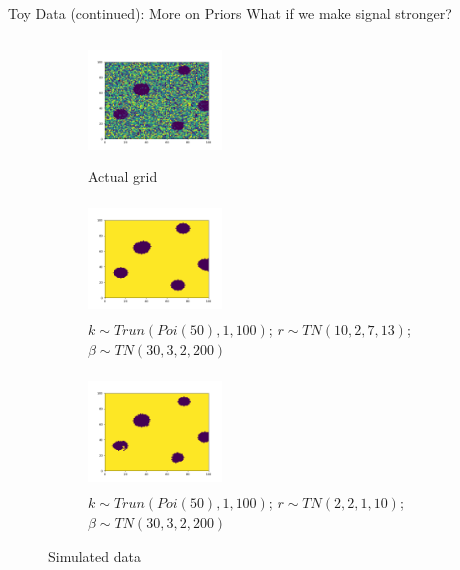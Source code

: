 \documentclass[10pt,mathserif]{beamer}
\begin{document}
\begin{frame}{Toy Data (continued): More on Priors}
What if we make signal stronger?
\begin{figure}[t!]
    \centering
    \begin{subfigure}[t]{0.3\textwidth}
        \centering
        \includegraphics[height=1.3in, width=1.4in]{../sim_toydata2D_mu8/BDC_gridactual}
        \caption{Actual grid}
    \end{subfigure}%
    \begin{subfigure}[t]{0.3\textwidth}
        \centering
        \includegraphics[height=1.2in, width=1.4in]{../sim_toydata2D_mu8/BDC_grid4_ss}
        \caption{ $k \sim Trun(Poi(50), 1, 100)$; $r \sim TN(10, 2, 7, 13)$; $\beta \sim TN(30, 3, 2, 200)$}
    \end{subfigure}%
        \begin{subfigure}[t]{0.3\textwidth}
        \centering
        \includegraphics[height=1.2in, width=1.4in]{../sim_toydata2D_mu8/BDC_grid5_ss}
        \caption{ $k \sim Trun(Poi(50), 1, 100)$; $r \sim TN(2, 2, 1, 10)$; $\beta \sim TN(30, 3, 2, 200)$}
    \end{subfigure}
    \caption{Simulated data}
\end{figure}
\end{frame}
\end{document}
